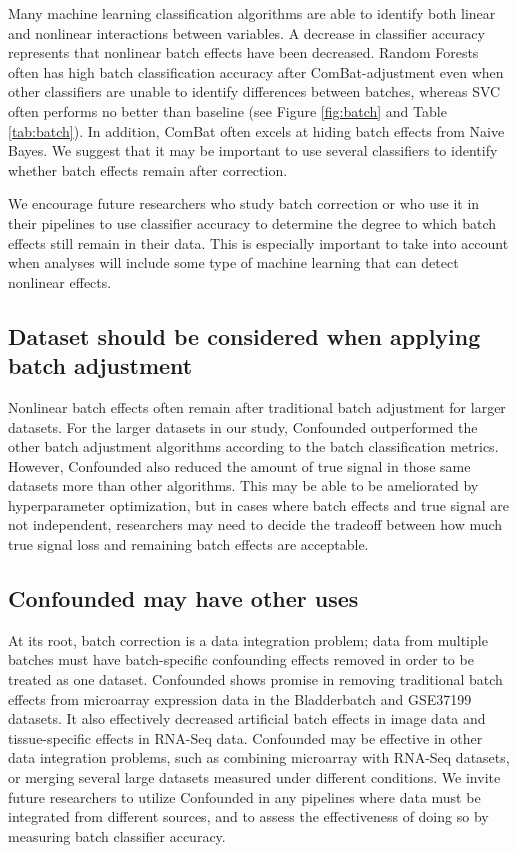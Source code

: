 \documentclass[notitlepage]{article}
\begin{document}
Many machine learning classification algorithms are able to identify both linear and nonlinear interactions between variables.
A decrease in classifier accuracy represents that nonlinear batch effects have been decreased.
Random Forests often has high batch classification accuracy after ComBat-adjustment even when other classifiers are unable to identify differences between batches, whereas SVC often performs no better than baseline (see Figure \ref{fig:batch} and Table \ref{tab:batch}).
In addition, ComBat often excels at hiding batch effects from Naive Bayes.
We suggest that it may be important to use several classifiers to identify whether batch effects remain after correction.

We encourage future researchers who study batch correction or who use it in their pipelines to use classifier accuracy to determine the degree to which batch effects still remain in their data.
This is especially important to take into account when analyses will include some type of machine learning that can detect nonlinear effects.

\subsection{Dataset should be considered when applying batch adjustment}

Nonlinear batch effects often remain after traditional batch adjustment for larger datasets.
For the larger datasets in our study, Confounded outperformed the other batch adjustment algorithms according to the batch classification metrics.
However, Confounded also reduced the amount of true signal in those same datasets more than other algorithms.
This may be able to be ameliorated by hyperparameter optimization,
but in cases where batch effects and true signal are not independent, researchers may need to decide the tradeoff between how much true signal loss and remaining batch effects are acceptable.

\subsection{Confounded may have other uses}

At its root, batch correction is a data integration problem;
data from multiple batches must have batch-specific confounding effects removed in order to be treated as one dataset.
Confounded shows promise in removing traditional batch effects from microarray expression data in the Bladderbatch and GSE37199 datasets.
It also effectively decreased artificial batch effects in image data and tissue-specific effects in RNA-Seq data.
Confounded may be effective in other data integration problems, such as combining microarray with RNA-Seq datasets, or merging several large datasets measured under different conditions.
We invite future researchers to utilize Confounded in any pipelines where data must be integrated from different sources, and to assess the effectiveness of doing so by measuring batch classifier accuracy.


\end{document}
